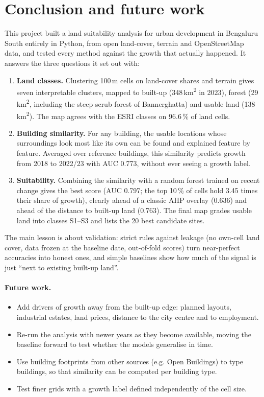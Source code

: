 \section{Conclusion and future work}\label{sec:conclusion}

This project built a land suitability analysis for urban development in Bengaluru South
entirely in Python, from open land-cover, terrain and OpenStreetMap data, and tested every
method against the growth that actually happened. It answers the three questions it set out
with:

\begin{enumerate}
  \item \textbf{Land classes.} Clustering 100\,m cells on land-cover shares and terrain gives
        seven interpretable clusters, mapped to built-up (348\,km\textsuperscript{2} in 2023),
        forest (29\,km\textsuperscript{2}, including the steep scrub forest of Bannerghatta) and
        usable land (138\,km\textsuperscript{2}). The map agrees with the ESRI classes on
        96.6\,\% of land cells.
  \item \textbf{Building similarity.} For any building, the usable locations whose surroundings
        look most like its own can be found and explained feature by feature. Averaged over
        reference buildings, this similarity predicts growth from 2018 to 2022/23 with
        AUC 0.773, without ever seeing a growth label.
  \item \textbf{Suitability.} Combining the similarity with a random forest trained on recent
        change gives the best score (AUC 0.797; the top 10\,\% of cells hold 3.45 times their
        share of growth), clearly ahead of a classic AHP overlay (0.636) and ahead of the
        distance to built-up land (0.763). The final map grades usable land into classes
        S1--S3 and lists the 20 best candidate sites.
\end{enumerate}

The main lesson is about validation: strict rules against leakage (no own-cell land cover, data
frozen at the baseline date, out-of-fold scores) turn near-perfect accuracies into honest ones,
and simple baselines show how much of the signal is just ``next to existing built-up land''.

\paragraph{Future work.}
\begin{itemize}
  \item Add drivers of growth away from the built-up edge: planned layouts, industrial estates,
        land prices, distance to the city centre and to employment.
  \item Re-run the analysis with newer years as they become available, moving the baseline
        forward to test whether the models generalise in time.
  \item Use building footprints from other sources (e.g. Open Buildings) to type buildings, so
        that similarity can be computed per building type.
  \item Test finer grids with a growth label defined independently of the cell size.
\end{itemize}
